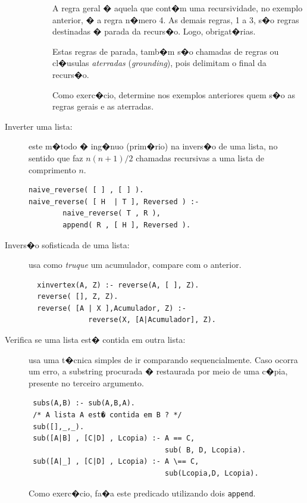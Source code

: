 \documentclass[final,a4paper]{article}
\begin{document}
\begin{description}
\begin{description}
\item[] A regra geral � aquela que cont�m uma recursividade, no exemplo
anterior, � a regra n�mero 4. As demais regras, 1 a 3, s�o regras
destinadas � parada da recurs�o. Logo, obrigat�rias.

\item[] Estas regras de parada, tamb�m s�o chamadas de regras ou cl�usulas  {\em aterradas} ({\em grounding}),
  pois delimitam o final da recurs�o.  

  
\item[] Como exerc�cio, determine nos exemplos anteriores quem s�o as regras gerais e as aterradas.

\end{description}

\newpage
\item [Inverter uma lista:] este m�todo � ing�nuo (prim�rio) na invers�o de uma lista, no sentido que faz  $n(n+1)/2$ chamadas recursivas a uma lista de comprimento $n$.
\begin{verbatim}
naive_reverse( [ ] , [ ] ).
naive_reverse( [ H  | T ], Reversed ) :-
        naive_reverse( T , R ),
        append( R , [ H ], Reversed ).
\end{verbatim}

\newpage
\item [Invers�o sofisticada de uma lista:]  usa como\/ {\em truque} \/ um acumulador, compare com o anterior.
\begin{verbatim}
  xinvertex(A, Z) :- reverse(A, [ ], Z).
  reverse( [], Z, Z).
  reverse( [A | X ],Acumulador, Z) :-
              reverse(X, [A|Acumulador], Z).
\end{verbatim}


\newpage
\item [Verifica se uma lista est� contida em outra lista:]  usa uma t�cnica simples de ir comparando sequencialmente. Caso ocorra um erro, a substring procurada � restaurada por meio de uma c�pia, presente
no terceiro argumento.

\begin{verbatim}
 subs(A,B) :- sub(A,B,A).    
 /* A lista A est� contida em B ? */
 sub([],_,_).
 sub([A|B] , [C|D] , Lcopia) :- A == C, 
                                sub( B, D, Lcopia).
 sub([A|_] , [C|D] , Lcopia) :- A \== C, 
                                sub(Lcopia,D, Lcopia).
\end{verbatim}
Como exerc�cio, fa�a este predicado utilizando dois \texttt{append}.



\end{description}
\end{document}
